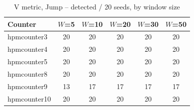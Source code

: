 \begin{table}[t]
\centering
\caption{V metric, Jump -- detected / 20 seeds, by window size}
\label{tab:window-sweep-v-jump}
\begin{tabular}{@{}lccccc@{}}
\toprule
Counter & $W$=5 & $W$=10 & $W$=20 & $W$=30 & $W$=50 \\
\midrule
hpmcounter3  & 20 & 20 & 20 & 20 & 20 \\
hpmcounter4  & 20 & 20 & 20 & 20 & 20 \\
hpmcounter5  & 20 & 20 & 20 & 20 & 20 \\
hpmcounter8  & 20 & 20 & 20 & 20 & 20 \\
hpmcounter9  & 13 & 17 & 17 & 17 & 17 \\
hpmcounter10 & 20 & 20 & 20 & 20 & 20 \\
\bottomrule
\end{tabular}
\end{table}
